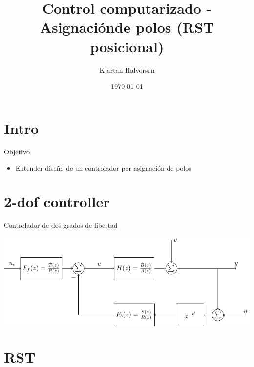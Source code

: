 \documentclass[presentation,aspectratio=169]{beamer}
\author{Kjartan Halvorsen}
\date{\today}
\title{Control computarizado - Asignaciónde polos (RST posicional)}
\begin{document}
\maketitle

\section{Intro}
\label{sec:org5a20044}

\begin{frame}[label={sec:org6525fbb}]{Objetivo}
\begin{itemize}
\item Entender diseño de un controlador por asignación de polos
\end{itemize}
\end{frame}

\section{2-dof controller}
\label{sec:org6b1dd2c}

\begin{frame}[label={sec:org77445c9}]{Controlador de dos grados de libertad}
\begin{center}
\includegraphics[width=0.8\linewidth]{../../figures/2dof-block-explicit}
\end{center}
\end{frame}

\section{RST}
\label{sec:org4389793}
\end{document}
